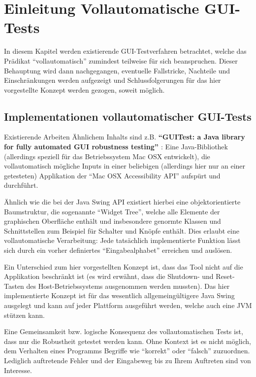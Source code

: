 \chapter{Einleitung Vollautomatische GUI-Tests}\label{chapter:introfullautoguitesting}


In diesem Kapitel werden existierende GUI-Testverfahren betrachtet, welche das Prädikat
``vollautomatisch'' zumindest teilweise für sich beanspruchen. Dieser Behauptung wird
dann nachgegangen, eventuelle Fallstricke, Nachteile und Einschränkungen werden aufgezeigt
und Schlussfolgerungen für das hier vorgestellte Konzept werden gezogen, soweit möglich.


\section{Implementationen vollautomatischer GUI-Tests}\label{section:fullautoguitestsimpl}


Existierende Arbeiten Ähnlichem Inhalts sind z.B. \textbf{``GUITest: a Java library for fully automated
GUI robustness testing'' \cite{GUITestBauersfeld}}: Eine Java-Bibliothek 
(allerdings speziell für das Betriebssystem Mac OSX entwickelt), die
vollautomatisch mögliche Inputs in einer beliebigen (allerdings hier nur an einer getesteten)
Applikation der ``Mac OSX Accessibility API'' aufspürt und durchführt.

Ähnlich wie die bei der Java Swing API existiert hierbei eine objektorientierte Baumstruktur,
die sogenannte ``Widget Tree'', welche alle Elemente der graphischen Oberfläche enthält
und insbesondere genormte Klassen und Schnittstellen zum Beispiel für Schalter
und Knöpfe enthält. Dies erlaubt eine vollautomatische Verarbeitung:
Jede tatsächlich implementierte Funktion lässt sich durch ein vorher definiertes
``Eingabealphabet'' erreichen und auslösen.

Ein Unterschied zum
hier vorgestellten Konzept ist, dass das Tool nicht auf die Applikation beschränkt ist (es wird
erwähnt, dass die Shutdown- und Reset-Tasten des Host-Betriebssystems ausgenommen werden
mussten). Das hier implementierte Konzept ist für das wesentlich allgemeingültigere Java Swing
ausgelegt und kann auf jeder Plattform ausgeführt werden, welche auch eine JVM stützen kann.

Eine Gemeinsamkeit bzw. logische Konsequenz des vollautomatischen Tests ist, dass nur
die Robustheit getestet werden kann. Ohne Kontext ist es nicht möglich, dem Verhalten eines
Programms Begriffe wie ``korrekt'' oder ``falsch'' zuzuordnen. Lediglich auftretende
Fehler und der Eingabeweg bis zu Ihrem Auftreten sind von Interesse.

